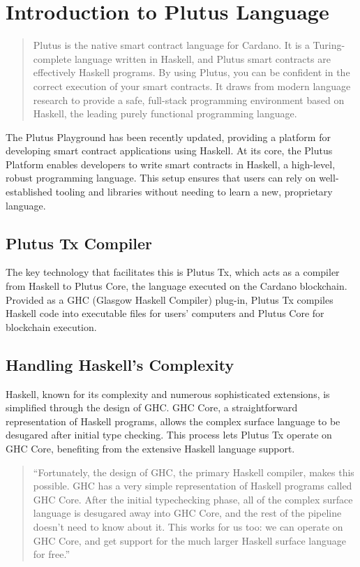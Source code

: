 \section{Introduction to Plutus Language} \label{sec:Languages}

\begin{quote}
Plutus is the native smart contract language for Cardano. It is a Turing-complete language written in Haskell, and Plutus smart contracts are effectively Haskell programs. By using Plutus, you can be confident in the correct execution of your smart contracts. It draws from modern language research to provide a safe, full-stack programming environment based on Haskell, the leading purely functional programming language.
\end{quote}


The Plutus Playground has been recently updated, providing a platform for developing smart contract applications using Haskell. At its core, the Plutus Platform enables developers to write smart contracts in Haskell, a high-level, robust programming language. This setup ensures that users can rely on well-established tooling and libraries without needing to learn a new, proprietary language.

\subsection{Plutus Tx Compiler}
The key technology that facilitates this is Plutus Tx, which acts as a compiler from Haskell to Plutus Core, the language executed on the Cardano blockchain. Provided as a GHC (Glasgow Haskell Compiler) plug-in, Plutus Tx compiles Haskell code into executable files for users' computers and Plutus Core for blockchain execution.

\subsection{Handling Haskell’s Complexity}
Haskell, known for its complexity and numerous sophisticated extensions, is simplified through the design of GHC. GHC Core, a straightforward representation of Haskell programs, allows the complex surface language to be desugared after initial type checking. This process lets Plutus Tx operate on GHC Core, benefiting from the extensive Haskell language support.

\begin{quote}
``Fortunately, the design of GHC, the primary Haskell compiler, makes this possible. GHC has a very simple representation of Haskell programs called GHC Core. After the initial typechecking phase, all of the complex surface language is desugared away into GHC Core, and the rest of the pipeline doesn’t need to know about it. This works for us too: we can operate on GHC Core, and get support for the much larger Haskell surface language for free.''
\end{quote}

